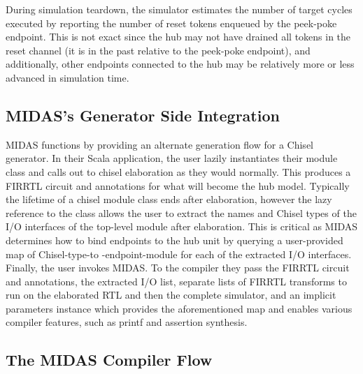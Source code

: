 During simulation teardown, the simulator estimates the number of target cycles executed by
reporting the number of reset tokens enqueued by the peek-poke endpoint. This is not exact since
the hub may not have drained all tokens in the reset channel (it is in the
past relative to the peek-poke endpoint), and additionally, other endpoints
connected to the hub may be relatively more or less advanced in simulation
time.

\subsection{MIDAS's Generator Side Integration}\label{sec:midas-chisel-api}

MIDAS functions by providing an alternate generation flow for a Chisel
generator.  In their Scala application, the user lazily instantiates their
module class and calls out to chisel elaboration as they would normally.
This produces a FIRRTL circuit and annotations for what will become the hub
model.  Typically the lifetime of a chisel module class ends after
elaboration, however the lazy reference to the class allows the user to
extract the names and Chisel types of the I/O interfaces of the top-level
module after elaboration. This is critical as MIDAS determines how to bind
endpoints to the hub unit by querying a user-provided map of Chisel-type-to
-endpoint-module for each of the extracted I/O interfaces. Finally, the user
invokes MIDAS. To the compiler they pass the FIRRTL circuit and annotations, the
extracted I/O list, separate lists of FIRRTL transforms to run on the
elaborated RTL and then the complete simulator, and an implicit parameters
instance which provides the aforementioned map and enables various compiler features,
such as printf and assertion synthesis.

\subsection{The MIDAS Compiler Flow}

